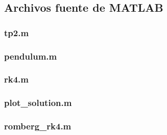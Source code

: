 \lstset{numbersep=5pt}

\lstset{inputencoding=cp1252}



\fontsize{9pt}{10pt}
\selectfont







\subsection{Archivos fuente de \textbf{MATLAB}}
\label{apendix:files}
\subsubsection{tp2.m}
\label{apendix:file_tp2}

\clearpage

\subsubsection{pendulum.m}
\label{apendix:file_pendulum}

\clearpage

\subsubsection{rk4.m}
\label{apendix:file_rk4}

\clearpage

\subsubsection{plot\_solution.m}
\label{apendix:file_pts}

\clearpage

\subsubsection{romberg\_rk4.m}
\label{apendix:file_romberg_rk4}

\clearpage

